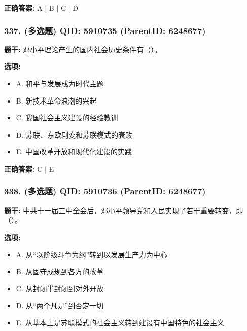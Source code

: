\documentclass[12pt,UTF8]{ctexart}
\begin{document}
\textbf{正确答案:}
A | B | C | D

\vspace{0.3em}\hrulefill\vspace{0.7em}

\subsubsection*{337. (多选题) \small QID: 5910735 (ParentID: 6248677)}

\textbf{题干:}
邓小平理论产生的国内社会历史条件有（）。



\textbf{选项:}
\begin{itemize}[leftmargin=*]

  \item A. 和平与发展成为时代主题

  \item B. 新技术革命浪潮的兴起

  \item C. 我国社会主义建设的经验教训

  \item D. 苏联、东欧剧变和苏联模式的衰败

  \item E. 中国改革开放和现代化建设的实践

\end{itemize}

\textbf{正确答案:}
C | E

\vspace{0.3em}\hrulefill\vspace{0.7em}

\subsubsection*{338. (多选题) \small QID: 5910736 (ParentID: 6248677)}

\textbf{题干:}
中共十一届三中全会后，邓小平领导党和人民实现了若干重要转变，即（）。



\textbf{选项:}
\begin{itemize}[leftmargin=*]

  \item A. 从“以阶级斗争为纲”转到以发展生产力为中心

  \item B. 从固守成规到各方的改革

  \item C. 从封闭半封闭到对外开放

  \item D. 从“两个凡是”到否定一切

  \item E. 从基本上是苏联模式的社会主义转到建设有中国特色的社会主义

\end{itemize}
\end{document}
